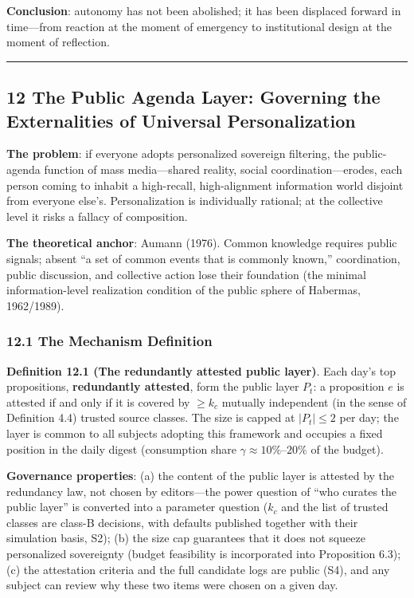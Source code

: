 \documentclass[
  11pt]{article}
\begin{document}
\textbf{Conclusion}: autonomy has not been abolished; it has been
displaced forward in time---from reaction at the moment of emergency to
institutional design at the moment of reflection.

\begin{center}\rule{0.5\linewidth}{0.5pt}\end{center}

\subsection{12 The Public Agenda Layer: Governing the Externalities of
Universal
Personalization}\label{the-public-agenda-layer-governing-the-externalities-of-universal-personalization}

\textbf{The problem}: if everyone adopts personalized sovereign
filtering, the public-agenda function of mass media---shared reality,
social coordination---erodes, each person coming to inhabit a
high-recall, high-alignment information world disjoint from everyone
else's. Personalization is individually rational; at the collective
level it risks a fallacy of composition.

\textbf{The theoretical anchor}: Aumann (1976). Common knowledge
requires public signals; absent ``a set of common events that is
commonly known,'' coordination, public discussion, and collective action
lose their foundation (the minimal information-level realization
condition of the public sphere of Habermas, 1962/1989).

\subsubsection{12.1 The Mechanism
Definition}\label{the-mechanism-definition}

\textbf{Definition 12.1 (The redundantly attested public layer)}. Each
day's top propositions, \textbf{redundantly attested}, form the public
layer \(P_t\): a proposition \(e\) is attested if and only if it is
covered by \(\ge k_c\) mutually independent (in the sense of Definition
4.4) trusted source classes. The size is capped at \(|P_t| \le 2\) per
day; the layer is common to all subjects adopting this framework and
occupies a fixed position in the daily digest (consumption share
\(\gamma \approx 10\%\)--\(20\%\) of the budget).

\textbf{Governance properties}: (a) the content of the public layer is
attested by the redundancy law, not chosen by editors---the power
question of ``who curates the public layer'' is converted into a
parameter question (\(k_c\) and the list of trusted classes are class-B
decisions, with defaults published together with their simulation basis,
S2); (b) the size cap guarantees that it does not squeeze personalized
sovereignty (budget feasibility is incorporated into Proposition 6.3);
(c) the attestation criteria and the full candidate logs are public
(S4), and any subject can review why these two items were chosen on a
given day.
\end{document}
